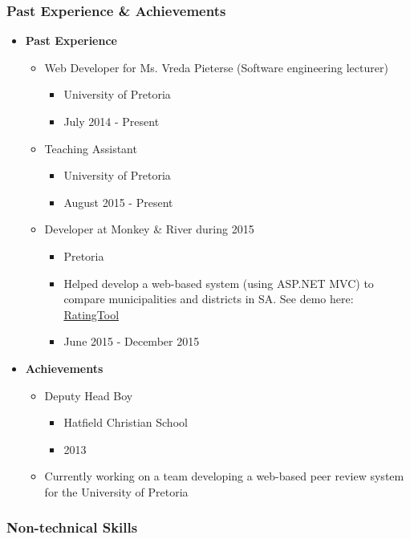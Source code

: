 \documentclass{article}
\begin{document}
\subsubsection{Past Experience \& Achievements}
			\begin{itemize}
				\item \textbf{Past Experience}
				\begin{itemize}
					\item Web Developer for Ms. Vreda Pieterse (Software engineering lecturer)
					\begin{itemize}
						\item University of Pretoria
						\item July 2014 - Present
					\end{itemize}
					\item Teaching Assistant
					\begin{itemize}
						\item University of Pretoria
						\item August 2015 - Present
					\end{itemize}
					\item Developer at Monkey \& River during 2015
					\begin{itemize}
						\item Pretoria
						\item Helped develop a web-based system (using ASP.NET MVC) to compare municipalities and districts in SA. See demo here: \href{http://salgabarometerdemo.org.za/RatingTool}{RatingTool}
						\item June 2015 - December 2015
					\end{itemize}
				\end{itemize}
				
				\item \textbf{Achievements}
				\begin{itemize}
					\item Deputy Head Boy
					\begin{itemize}
						\item Hatfield Christian School
						\item 2013
					\end{itemize}
					\item Currently working on a team developing a web-based peer review system for the University of Pretoria
				\end{itemize}
			\end{itemize}
		\subsubsection{Non-technical Skills}
\end{document}
